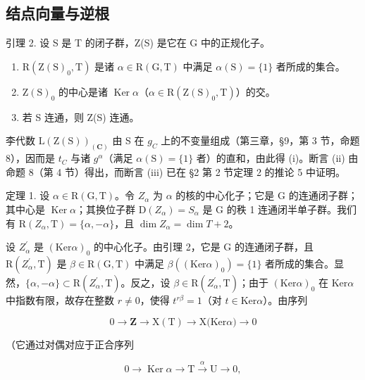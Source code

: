 \subsection{结点向量与逆根}

引理 2. 设 S 是 T 的闭子群，Z(S) 是它在 G 中的正规化子。

\begin{enumerate}
\def\labelenumi{(\roman{enumi})}
\item
  \(\mathrm{R}(\mathrm{Z}(\mathrm{S})_0,\mathrm{T})\) 是诸 \(\alpha \in \mathrm{R}(\mathrm{G},\mathrm{T})\) 中满足 \(\alpha (\mathrm{S}) = \{1\}\) 者所成的集合。
\item
  \(\mathrm{Z(S)_0}\) 的中心是诸 \(\operatorname {Ker}\alpha\)（\(\alpha \in \mathrm{R}(\mathrm{Z(S)}_0,\mathrm{T})\)）的交。
\item
  若 S 连通，则 Z(S) 连通。
\end{enumerate}

李代数 \(\mathrm{L}(\mathrm{Z}(\mathrm{S}))_{(\mathbf{C})}\) 由 S 在 \(g_{C}\) 上的不变量组成（第三章，§9，第 3 节，命题 8），因而是 \(t_{C}\) 与诸 \(g^{\alpha}\)（满足 \(\alpha(\mathrm{S})=\{1\}\) 者）的直和，由此得 (i)。断言 (ii) 由命题 8（第 4 节）得出，而断言 (iii) 已在 §2 第 2 节定理 2 的推论 5 中证明。

定理 1. 设 \(\alpha \in \mathrm{R}(\mathrm{G},\mathrm{T})\)。令 \(Z_{\alpha}\) 为 \(\alpha\) 的核的中心化子；它是 \(\mathrm{G}\) 的连通闭子群；其中心是 \(\operatorname{Ker} \alpha\)；其换位子群 \(\mathrm{D}(Z_{\alpha}) = S_{\alpha}\) 是 \(\mathrm{G}\) 的秩 1 连通闭半单子群。我们有 \(\mathrm{R}(Z_{\alpha},\mathrm{T}) = \{\alpha, -\alpha\}\)，且 \(\dim Z_{\alpha} = \dim T + 2\)。

设 \(Z_{\alpha}^{\prime}\) 是 \((\mathrm{Ker}\alpha)_0\) 的中心化子。由引理 2，它是 G 的连通闭子群，且 \(\mathrm{R}(Z_{\alpha}^{\prime},\mathrm{T})\) 是 \(\beta \in \mathrm{R}(\mathrm{G},\mathrm{T})\) 中满足 \(\beta ((\mathrm{Ker}\alpha)_0) = \{1\}\) 者所成的集合。显然，\(\{\alpha , - \alpha \} \subset \mathrm{R}(Z_{\alpha}^{\prime},\mathrm{T})\)。反之，设 \(\beta \in \mathrm{R}(Z_{\alpha}^{\prime},\mathrm{T})\)；由于 \((\mathrm{Ker}\alpha)_0\) 在 \(\mathrm{Ker}\alpha\) 中指数有限，故存在整数 \(r\neq 0\)，使得 \(t^{r\beta} = 1\)（对 \(t\in \mathrm{Ker}\alpha\)）。由序列

\[
0 \longrightarrow \mathbf {Z} \longrightarrow \mathrm{X(T)} \longrightarrow \mathrm{X(Ker} \alpha) \longrightarrow 0
\]

（它通过对偶对应于正合序列

\[
0 \longrightarrow \operatorname{Ker} \alpha \longrightarrow \mathrm{T} \stackrel {{\alpha}} {{\longrightarrow}} \mathrm{U} \longrightarrow 0,
\]

